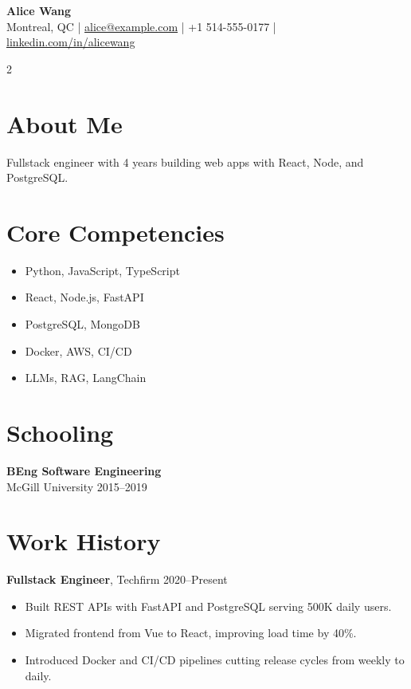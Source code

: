 \documentclass[10pt, letterpaper]{article}
\begin{document}
\begin{center}
    {\Large \textbf{Alice Wang}}\\[4pt]
    Montreal, QC \quad|\quad
    \href{mailto:alice@example.com}{alice@example.com} \quad|\quad
    +1 514-555-0177 \quad|\quad
    \href{https://linkedin.com/in/alicewang}{linkedin.com/in/alicewang}
\end{center}

\begin{paracol}{2}

\section*{About Me}
Fullstack engineer with 4 years building web apps with React, Node, and PostgreSQL.

\section*{Core Competencies}
\begin{itemize}[leftmargin=*]
    \item Python, JavaScript, TypeScript
    \item React, Node.js, FastAPI
    \item PostgreSQL, MongoDB
    \item Docker, AWS, CI/CD
    \item LLMs, RAG, LangChain
\end{itemize}

\section*{Schooling}
\textbf{BEng Software Engineering}\\
McGill University \hfill 2015--2019

\switchcolumn

\section*{Work History}
\textbf{Fullstack Engineer}, Techfirm \hfill 2020--Present
\begin{itemize}[leftmargin=*]
    \item Built REST APIs with FastAPI and PostgreSQL serving 500K daily users.
    \item Migrated frontend from Vue to React, improving load time by 40\%.
    \item Introduced Docker and CI/CD pipelines cutting release cycles from weekly to daily.
\end{itemize}


\end{paracol}
\end{document}
